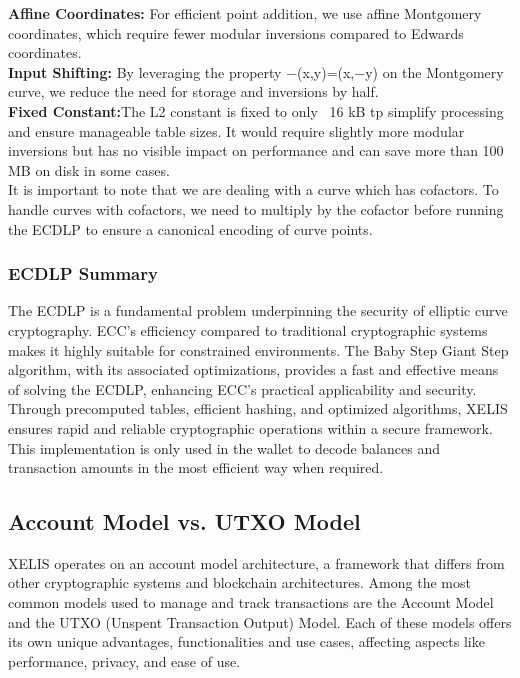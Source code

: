 \documentclass[10pt,a4paper,twocolumn]{article}
\begin{document}
\textbf{Affine Coordinates:} For efficient point addition, we use affine Montgomery coordinates, which require fewer modular inversions compared to Edwards coordinates.\\

\textbf{Input Shifting:} By leveraging the property −(x,y)=(x,−y) on the Montgomery curve, we reduce the need for storage and inversions by half.\\

\textbf{Fixed Constant:}The L2 constant is fixed to only ~16 kB tp simplify processing and ensure manageable table sizes. It would require slightly more modular inversions but has no visible impact on performance and can save more than 100 MB on disk in some cases.\\

It is important to note that we are dealing with a curve which has cofactors. To handle curves with cofactors, we need to multiply by the cofactor before running the ECDLP to ensure a canonical encoding of curve points.\\

\subsubsection{ECDLP Summary}

The ECDLP is a fundamental problem underpinning the security of elliptic curve cryptography. ECC’s efficiency compared to traditional cryptographic systems makes it highly suitable for constrained environments. The Baby Step Giant Step algorithm, with its associated optimizations, provides a fast and effective means of solving the ECDLP, enhancing ECC's practical applicability and security. Through precomputed tables, efficient hashing, and optimized algorithms, XELIS ensures rapid and reliable cryptographic operations within a secure framework.\\

This implementation is only used in the wallet to decode balances and transaction amounts in the most efficient way when required.

\subsection{Account Model vs. UTXO Model}

XELIS operates on an account model architecture, a framework that differs from other cryptographic systems and blockchain architectures. Among the most common models used to manage and track transactions are the Account Model and the UTXO (Unspent Transaction Output) Model. Each of these models offers its own unique advantages, functionalities and use cases, affecting aspects like performance, privacy, and ease of use.\\
\end{document}

